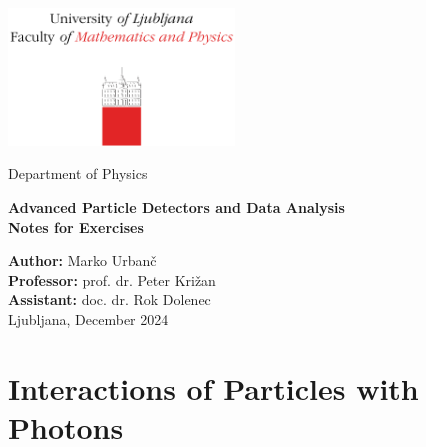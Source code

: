 \documentclass[10pt, titlepage, a4paper]{article}
\numberwithin{equation}{section}
\begin{document}
\begin{titlepage}
{\centering
\includegraphics[width=6cm]{logo_fmf.pdf}

\vspace{0.8cm}
{\small Department of Physics}

\vspace{5cm}
\vspace{0.5cm}
{\huge\textbf{Advanced Particle Detectors and Data Analysis}} \\
\vspace{0.5cm}
{\large\textbf{Notes for Exercises}}

\vfill
\textbf{Author:} Marko Urbanč \\
\textbf{Professor:} prof. dr. Peter Križan \\ 
\textbf{Assistant:} doc. dr. Rok Dolenec \\

\vspace{1cm}
Ljubljana, December 2024 \\
}
\vspace{3cm}
\end{titlepage}

\hypersetup{pageanchor=true}
\setcounter{page}{2}
\tableofcontents
\vspace{1cm}


\section{Interactions of Particles with Photons}
\end{document}
